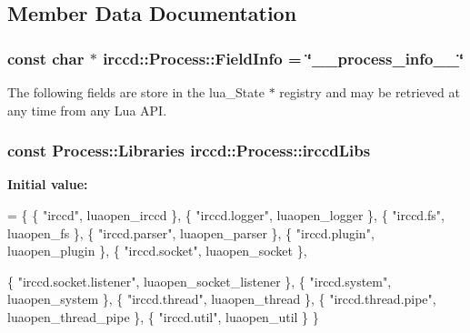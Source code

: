\subsection{Member Data Documentation}
\hypertarget{a00052_a7b44c70724bedbfc99ac2fe58bc2c6b5}{
\subsubsection[{Field\-Info}]{\setlength{\rightskip}{0pt plus 5cm}const char $\ast$ irccd\-::\-Process\-::\-Field\-Info = \char`\"{}\-\_\-\-\_\-process\-\_\-info\-\_\-\-\_\-\char`\"{}\hspace{0.3cm}{\ttfamily [static]}}}\label{a00052_a7b44c70724bedbfc99ac2fe58bc2c6b5}
The following fields are store in the lua\-\_\-\-State $\ast$ registry and may be retrieved at any time from any Lua A\-P\-I. \hypertarget{a00052_abc76db819d406ffb1c7ec182d4d1d773}{
\subsubsection[{irccd\-Libs}]{\setlength{\rightskip}{0pt plus 5cm}const {\bf Process\-::\-Libraries} irccd\-::\-Process\-::irccd\-Libs\hspace{0.3cm}{\ttfamily [static]}}}\label{a00052_abc76db819d406ffb1c7ec182d4d1d773}
{\bfseries Initial value\-:}
\begin{DoxyCode}
= \{
    \{ \textcolor{stringliteral}{"irccd"},          luaopen\_irccd       \},
    \{ \textcolor{stringliteral}{"irccd.logger"},       luaopen\_logger      \},
    \{ \textcolor{stringliteral}{"irccd.fs"},           luaopen\_fs      \},
    \{ \textcolor{stringliteral}{"irccd.parser"},       luaopen\_parser      \},
    \{ \textcolor{stringliteral}{"irccd.plugin"},       luaopen\_plugin      \},
    \{ \textcolor{stringliteral}{"irccd.socket"},       luaopen\_socket      \},



    \{ \textcolor{stringliteral}{"irccd.socket.listener"},  luaopen\_socket\_listener \},
    \{ \textcolor{stringliteral}{"irccd.system"},       luaopen\_system      \},
    \{ \textcolor{stringliteral}{"irccd.thread"},       luaopen\_thread      \},
    \{ \textcolor{stringliteral}{"irccd.thread.pipe"},      luaopen\_thread\_pipe \},
    \{ \textcolor{stringliteral}{"irccd.util"},         luaopen\_util        \}
\}
\end{DoxyCode}
